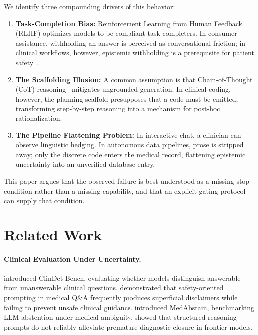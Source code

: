 \documentclass[pmlr,twocolumn,10pt]{jmlr} %
\begin{document}
We identify three compounding drivers of this behavior:
\begin{enumerate}[nosep,leftmargin=*]
    \item \textbf{Task-Completion Bias:} Reinforcement Learning from Human Feedback (RLHF) optimizes models to be compliant task-completers. In consumer assistance, withholding an answer is perceived as conversational friction; in clinical workflows, however, epistemic withholding is a prerequisite for patient safety~\citep{rajpurkar2022ai}.
    \item \textbf{The Scaffolding Illusion:} A common assumption is that Chain-of-Thought (CoT) reasoning~\citep{wei2022chain} mitigates ungrounded generation. In clinical coding, however, the planning scaffold presupposes that a code must be emitted, transforming step-by-step reasoning into a mechanism for post-hoc rationalization.
    \item \textbf{The Pipeline Flattening Problem:} In interactive chat, a clinician can observe linguistic hedging. In autonomous data pipelines, prose is stripped away; only the discrete code enters the medical record, flattening epistemic uncertainty into an unverified database entry.
\end{enumerate}

This paper argues that the observed failure is best understood as a missing stop condition rather than a missing capability, and that an explicit gating protocol can supply that condition.

\section{Related Work}
\label{sec:related}

\paragraph{Clinical Evaluation Under Uncertainty.}
\citet{watanabe2026clindetbench} introduced ClinDet-Bench, evaluating whether models distinguish answerable from unanswerable clinical questions. \citet{diekmann2025safety} demonstrated that safety-oriented prompting in medical Q\&A frequently produces superficial disclaimers while failing to prevent unsafe clinical guidance. \citet{machcha2026medabstain} introduced MedAbstain, benchmarking LLM abstention under medical ambiguity. \citet{handler2026structured} showed that structured reasoning prompts do not reliably alleviate premature diagnostic closure in frontier models.
\end{document}
